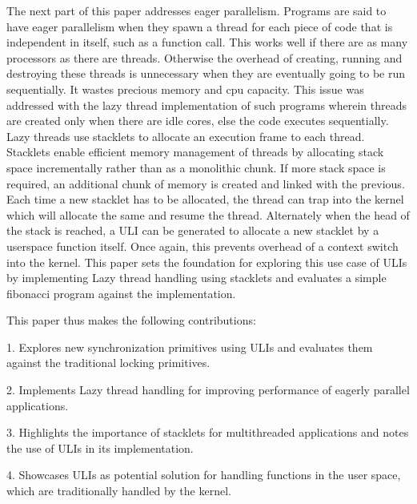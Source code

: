 The next part of this paper addresses eager parallelism. Programs are said
to have eager parallelism when they spawn a thread for each piece of code that
is independent in itself, such as a function call. This works well if there are
as many processors as there are threads. Otherwise the overhead of creating,
running and destroying these threads is unnecessary when they are eventually
going to be run sequentially. It wastes precious memory and cpu capacity. This
issue was addressed with the lazy thread implementation of such programs wherein
threads are created only when there are idle cores, else the code executes
sequentially. Lazy threads use stacklets to allocate an execution frame to each
thread. Stacklets enable efficient memory management of threads by allocating
stack space incrementally rather than as a monolithic chunk. If more stack space
is required, an additional chunk of memory is created and linked with the
previous. Each time a new stacklet has to be allocated, the thread can trap into
the kernel which will allocate the same and resume the thread. Alternately when
the head of the stack is reached, a ULI can be generated to allocate a new
stacklet by a userspace function itself. Once again, this prevents overhead of a
context switch into the kernel. This paper sets the foundation for exploring
this use case of ULIs by implementing Lazy thread handling using stacklets and
evaluates a simple fibonacci program against the implementation.

This paper thus makes the following contributions:

1. Explores new synchronization primitives using ULIs and evaluates them against
the traditional locking primitives.

2. Implements Lazy thread handling for improving performance of eagerly parallel
applications.

3. Highlights the importance of stacklets for multithreaded applications and
notes the use of ULIs in its implementation.

4. Showcases ULIs as potential solution for handling functions in the user space,
which are traditionally handled by the kernel.

\lipsum

